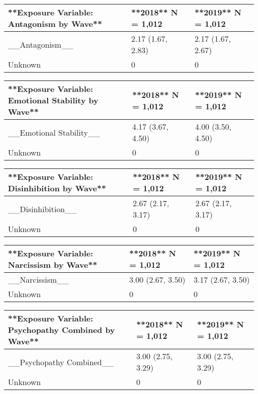 \documentclass[
  singlecolumn]{article}
\begin{document}
\begin{table}

\centering
\begin{tabular}[t]{lll}
\toprule
**Exposure Variable: Antagonism by Wave** & **2018**  
N = 1,012 & **2019**  
N = 1,012\\
\midrule
\_\_Antagonism\_\_ & 2.17 (1.67, 2.83) & 2.17 (1.67, 2.67)\\
Unknown & 0 & 0\\
\bottomrule
\end{tabular}
\centering
\begin{tabular}[t]{lll}
\toprule
**Exposure Variable: Emotional Stability by Wave** & **2018**  
N = 1,012 & **2019**  
N = 1,012\\
\midrule
\_\_Emotional Stability\_\_ & 4.17 (3.67, 4.50) & 4.00 (3.50, 4.50)\\
Unknown & 0 & 0\\
\bottomrule
\end{tabular}
\centering
\begin{tabular}[t]{lll}
\toprule
**Exposure Variable: Disinhibition by Wave** & **2018**  
N = 1,012 & **2019**  
N = 1,012\\
\midrule
\_\_Disinhibition\_\_ & 2.67 (2.17, 3.17) & 2.67 (2.17, 3.17)\\
Unknown & 0 & 0\\
\bottomrule
\end{tabular}
\centering
\begin{tabular}[t]{lll}
\toprule
**Exposure Variable: Narcissism by Wave** & **2018**  
N = 1,012 & **2019**  
N = 1,012\\
\midrule
\_\_Narcissism\_\_ & 3.00 (2.67, 3.50) & 3.17 (2.67, 3.50)\\
Unknown & 0 & 0\\
\bottomrule
\end{tabular}
\centering
\begin{tabular}[t]{lll}
\toprule
**Exposure Variable: Psychopathy Combined by Wave** & **2018**  
N = 1,012 & **2019**  
N = 1,012\\
\midrule
\_\_Psychopathy Combined\_\_ & 3.00 (2.75, 3.29) & 3.00 (2.75, 3.29)\\
Unknown & 0 & 0\\
\bottomrule
\end{tabular}
\end{table}
\end{document}
